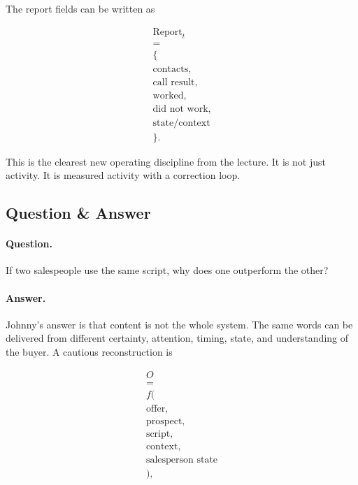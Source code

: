 \documentclass[11pt,oneside]{book}
\begin{document}
The report fields can be written as

\begin{equation}
\begin{gathered}
\text{Report}_t\\
=\\
\{\\
\text{contacts},\\
\text{call result},\\
\text{worked},\\
\text{did not work},\\
\text{state/context}\\
\}.
\end{gathered}
\end{equation}

This is the clearest new operating discipline from the lecture. It is not just activity. It is measured activity with a correction loop.

\subsection{Question \& Answer}

\paragraph{Question.}
If two salespeople use the same script, why does one outperform the other?

\paragraph{Answer.}
Johnny's answer is that content is not the whole system. The same words can be delivered from different certainty, attention, timing, state, and understanding of the buyer. A cautious reconstruction is

\begin{equation}
\begin{gathered}
O\\
=\\
f(\\
\text{offer},\\
\text{prospect},\\
\text{script},\\
\text{context},\\
\text{salesperson state}\\
),
\end{gathered}
\end{equation}
\end{document}
